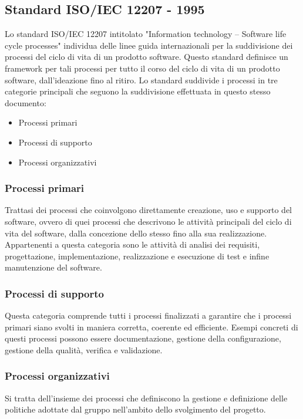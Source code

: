 \documentclass[10pt]{article}
\begin{document}
\begin{justify}
    \subsection{Standard ISO/IEC 12207 - 1995}
    \label{standard_12207}
    Lo standard ISO/IEC 12207 intitolato "Information technology – Software life cycle processes" individua delle linee guida internazionali
    per la suddivisione dei processi del ciclo di vita  di un prodotto software. Questo standard definisce un framework per tali processi
    per tutto il corso del ciclo di vita di un prodotto software, dall'ideazione fino al ritiro.
    Lo standard suddivide i processi in tre categorie principali che seguono la suddivisione effettuata in questo stesso documento:
    \begin{itemize}
        \item Processi primari
        \item Processi di supporto
        \item Processi organizzativi
    \end{itemize}

        \subsubsection{Processi primari}
        Trattasi dei processi che coinvolgono direttamente creazione, uso e supporto del software, ovvero di quei processi che descrivono
        le attività principali del ciclo di vita del software, dalla concezione dello stesso fino alla sua realizzazione. Appartenenti a questa 
        categoria sono le attività di analisi dei requisiti, progettazione, implementazione, realizzazione e esecuzione di test e infine 
        manutenzione del software.

        \subsubsection{Processi di supporto}
        Questa categoria comprende tutti i processi finalizzati a garantire che i processi primari siano svolti in maniera corretta, coerente ed
        efficiente. Esempi concreti di questi processi possono essere documentazione, gestione della configurazione, gestione della qualità, 
        verifica e validazione.

        \subsubsection{Processi organizzativi}
        Si tratta dell'insieme dei processi che definiscono la gestione e definizione delle politiche adottate dal gruppo nell'ambito dello
        svolgimento del progetto.



\end{justify}
\end{document}
